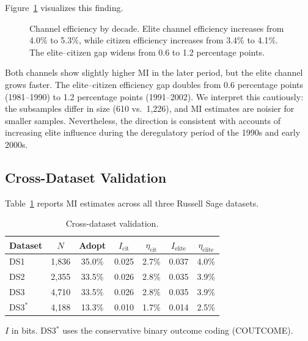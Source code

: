 \documentclass[twocolumn,10pt]{article}
\begin{document}
Figure~\ref{fig:temporal} visualizes this finding.

\begin{figure}[t]
\centering
{}
\caption{Channel efficiency by decade.  Elite channel efficiency increases from 4.0\% to 5.3\%, while citizen efficiency increases from 3.4\% to 4.1\%.  The elite--citizen gap widens from 0.6 to 1.2 percentage points.}
\label{fig:temporal}
\end{figure}

Both channels show slightly higher MI in the later period, but the elite channel grows faster.  The elite--citizen efficiency gap doubles from 0.6 percentage points (1981--1990) to 1.2 percentage points (1991--2002).  We interpret this cautiously: the subsamples differ in size (610 vs.\ 1,226), and MI estimates are noisier for smaller samples.  Nevertheless, the direction is consistent with accounts of increasing elite influence during the deregulatory period of the 1990s and early 2000s.

\subsection{Cross-Dataset Validation}

Table~\ref{tab:crossval} reports MI estimates across all three Russell Sage datasets.

\begin{table}[t]
\centering
\caption{Cross-dataset validation.}
\label{tab:crossval}
\begin{tabular}{@{}lcccccc@{}}
\toprule
Dataset & $N$ & Adopt & $I_\text{cit}$ & $\eta_\text{cit}$ & $I_\text{elite}$ & $\eta_\text{elite}$ \\
\midrule
DS1 & 1,836 & 35.0\% & 0.025 & 2.7\% & 0.037 & 4.0\% \\
DS2 & 2,355 & 33.5\% & 0.026 & 2.8\% & 0.035 & 3.9\% \\
DS3 & 4,710 & 33.5\% & 0.026 & 2.8\% & 0.035 & 3.9\% \\
DS3$^*$ & 4,188 & 13.3\% & 0.010 & 1.7\% & 0.014 & 2.5\% \\
\bottomrule
\end{tabular}
\smallskip

\footnotesize{$I$ in bits.  DS3$^*$ uses the conservative binary outcome coding (COUTCOME).}
\end{table}
\end{document}
